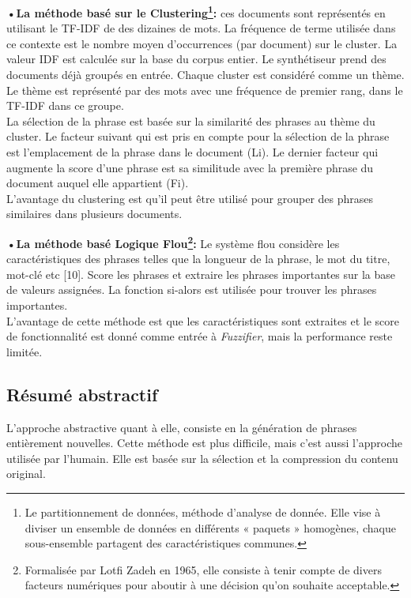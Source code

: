         \textbf{•La méthode basé sur le Clustering\footnote{Le partitionnement de données, méthode d'analyse de donnée. Elle vise à diviser un ensemble de données en différents « paquets » homogènes, chaque sous-ensemble partagent des caractéristiques communes.}:} ces documents sont représentés en utilisant le TF-IDF de des dizaines de mots. La fréquence de terme utilisée dans ce contexte est le nombre moyen d'occurrences (par document) sur le cluster. La valeur IDF est calculée sur la base du corpus entier. Le synthétiseur prend des documents déjà groupés en entrée. Chaque cluster est considéré comme un thème.
            Le thème est représenté par des mots avec une fréquence de premier rang, dans le TF-IDF dans ce groupe.\\
            La sélection de la phrase est basée sur la similarité des phrases au thème du cluster. Le facteur suivant qui est pris en compte pour la sélection de la phrase est l'emplacement de la phrase dans le document (Li). Le dernier facteur qui augmente la score d'une phrase est sa similitude avec la première phrase du document auquel elle appartient
            (Fi).\\
            L'avantage du clustering est qu'il peut être utilisé pour grouper des phrases similaires dans plusieurs documents.\cite{surveysummarization}
            
        \textbf{•La méthode basé Logique Flou\footnote{Formalisée par Lotfi Zadeh en 1965, elle consiste à tenir compte de divers facteurs numériques pour aboutir à une décision qu'on souhaite acceptable.}:} Le système flou considère les caractéristiques des phrases telles que la longueur de la phrase, le mot du titre, mot-clé etc [10]. Score les phrases et extraire les phrases importantes sur la base de valeurs assignées. La fonction si-alors est utilisée pour trouver les phrases importantes.\\
        L'avantage de cette méthode est que les caractéristiques sont extraites et le score de fonctionnalité est donné comme entrée à \emph{Fuzzifier}, mais la performance reste limitée.\cite{surveysummarization}

    \subsection{Résumé abstractif}
        L'approche abstractive quant à elle, consiste en la génération de phrases entièrement nouvelles. Cette méthode est plus difficile, mais c'est aussi l'approche utilisée par l'humain. Elle est basée sur la sélection et la compression du contenu original.

